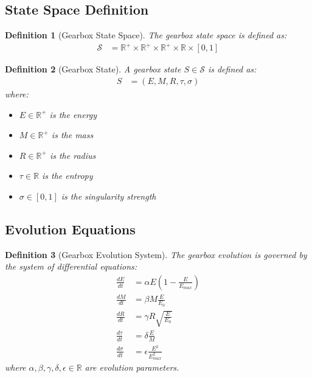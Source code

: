 \documentclass[12pt,a4paper]{article}
\newtheorem{definition}{Definition}
\begin{document}
\subsection{State Space Definition}

\begin{definition}[Gearbox State Space]
The gearbox state space is defined as:
\begin{align}
\mathcal{S} &= \mathbb{R}^+ \times \mathbb{R}^+ \times \mathbb{R}^+ \times \mathbb{R} \times [0, 1]
\end{align}
\end{definition}

\begin{definition}[Gearbox State]
A gearbox state $S \in \mathcal{S}$ is defined as:
\begin{align}
S &= (E, M, R, \tau, \sigma)
\end{align}
where:
\begin{itemize}
\item $E \in \mathbb{R}^+$ is the energy
\item $M \in \mathbb{R}^+$ is the mass
\item $R \in \mathbb{R}^+$ is the radius
\item $\tau \in \mathbb{R}$ is the entropy
\item $\sigma \in [0, 1]$ is the singularity strength
\end{itemize}
\end{definition}

\subsection{Evolution Equations}

\begin{definition}[Gearbox Evolution System]
The gearbox evolution is governed by the system of differential equations:
\begin{align}
\frac{dE}{dt} &= \alpha E \left(1 - \frac{E}{E_{max}}\right) \\
\frac{dM}{dt} &= \beta M \frac{E}{E_0} \\
\frac{dR}{dt} &= \gamma R \sqrt{\frac{E}{E_0}} \\
\frac{d\tau}{dt} &= \delta \frac{E}{M} \\
\frac{d\sigma}{dt} &= \epsilon \frac{E^2}{E_{max}^2}
\end{align}
where $\alpha, \beta, \gamma, \delta, \epsilon \in \mathbb{R}$ are evolution parameters.
\end{definition}
\end{document}
